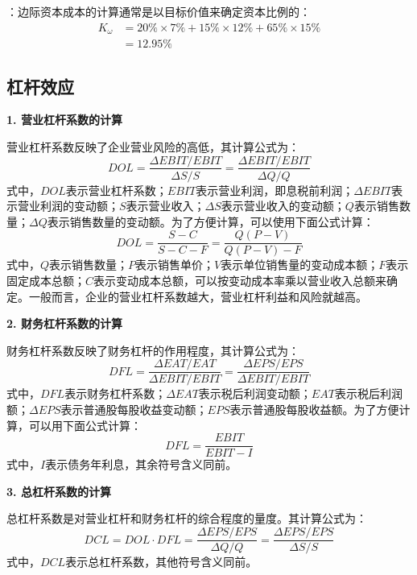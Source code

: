 \documentclass[
  10pt,
  twoside,
  openany,
  b5paper, %
  colorscheme = black, %
  xits = false,
]{qyxf-book}
\begin{document}
\solve[答]：边际资本成本的计算通常是以目标价值来确定资本比例的：
\begin{equation*}
	\begin{aligned}
		K_\omega &= 20\% \times 7\% + 15\% \times 12\% + 65\% \times 15\% \\
		&=12.95\%
	\end{aligned}
	
\end{equation*}

\subsection{杠杆效应}

\textbf{1. 营业杠杆系数的计算}

营业杠杆系数反映了企业营业风险的高低，其计算公式为：
\begin{equation*}
	DOL = \frac{\Delta EBIT / EBIT}{\Delta S/ S} =  \frac{\Delta EBIT / EBIT}{\Delta Q/ Q} 
\end{equation*}
式中，$DOL$表示营业杠杆系数；$EBIT$表示营业利润，即息税前利润；$\Delta EBIT$表示营业利润的变动额；$S$表示营业收入；$\Delta S$表示营业收入的变动额；$Q$表示销售数量；$\Delta Q$表示销售数量的变动额。为了方便计算，可以使用下面公式计算：
\begin{equation*}
	DOL = \frac{S-C}{S-C-F} = \frac{Q(P-V)}{Q(P-V)-F}
\end{equation*}
式中，$Q$表示销售数量；$P$表示销售单价；$V$表示单位销售量的变动成本额；$F$表示固定成本总额；$C$表示变动成本总额，可以按变动成本率乘以营业收入总额来确定。一般而言，企业的营业杠杆系数越大，营业杠杆利益和风险就越高。

\textbf{2. 财务杠杆系数的计算}

财务杠杆系数反映了财务杠杆的作用程度，其计算公式为：
\begin{equation*}
	DFL = \frac{\Delta EAT /EAT}{\Delta EBIT / EBIT} = \frac{\Delta EPS/EPS}{\Delta EBIT /EBIT} 
\end{equation*}
式中，$DFL$表示财务杠杆系数；$\Delta EAT$表示税后利润变动额；$EAT$表示税后利润额；$\Delta EPS$表示普通股每股收益变动额；$EPS$表示普通股每股收益额。为了方便计算，可以用下面公式计算：
\begin{equation*}
	DFL = \frac{EBIT}{EBIT-I}
\end{equation*}
式中，$I$表示债务年利息，其余符号含义同前。

\textbf{3. 总杠杆系数的计算}

总杠杆系数是对营业杠杆和财务杠杆的综合程度的量度。其计算公式为：
\begin{equation*}
	DCL = DOL \cdot DFL = \frac{\Delta EPS/EPS}{\Delta Q/Q} = \frac{\Delta EPS/EPS}{\Delta S/S}
\end{equation*}
式中，$DCL$表示总杠杆系数，其他符号含义同前。
\end{document}
